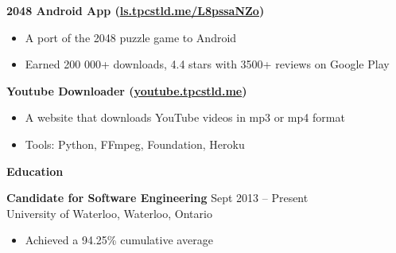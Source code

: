 \documentclass{letter}
\begin{document}
\vspace{-1.5mm}
{\bfseries 2048 Android App (\href{http://ls.tpcstld.me/L8pssaNZo}{\uline{ls.tpcstld.me/L8pssaNZo}})}
\vspace{-3mm}
\begin{itemize}
    \item A port of the 2048 puzzle game to Android
    \item Earned 200 000+ downloads, 4.4 stars with 3500+ reviews on Google Play
\end{itemize}
\vspace{-3mm}
{\bfseries Youtube Downloader (\href{http://youtube.tpcstld.me}{\uline{youtube.tpcstld.me}})}
\vspace{-3mm}
\begin{itemize}
    \item A website that downloads YouTube videos in mp3 or mp4 format
    \item Tools: Python, FFmpeg, Foundation, Heroku
\end{itemize}

{\bfseries \Large Education}

\vspace{-1.5mm}
{\bfseries Candidate for Software Engineering} \hfill Sept 2013 -- Present \\
University of Waterloo, Waterloo, Ontario
\vspace{-3mm}
\begin{itemize}
    \item Achieved a 94.25\% cumulative average
\end{itemize}
\end{document}
